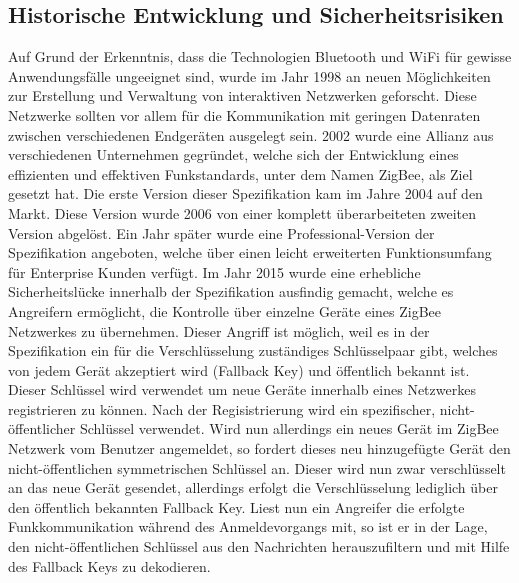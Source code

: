 \begin{multicols}{3}
\subsection*{Historische Entwicklung und Sicherheitsrisiken}
Auf Grund der Erkenntnis, dass die Technologien Bluetooth und WiFi für gewisse Anwendungsfälle ungeeignet sind, wurde im Jahr 1998 an neuen Möglichkeiten zur Erstellung und Verwaltung von interaktiven Netzwerken geforscht. Diese Netzwerke sollten vor allem für die Kommunikation mit geringen Datenraten zwischen verschiedenen Endgeräten ausgelegt sein. 2002 wurde eine Allianz aus verschiedenen Unternehmen gegründet, welche sich der Entwicklung eines effizienten und effektiven Funkstandards, unter dem Namen ZigBee, als Ziel gesetzt hat. Die erste Version dieser Spezifikation kam im Jahre 2004 auf den Markt. Diese Version wurde 2006 von einer komplett überarbeiteten zweiten Version abgelöst. Ein Jahr später wurde eine Professional-Version der Spezifikation angeboten, welche über einen leicht erweiterten Funktionsumfang für Enterprise Kunden verfügt. 
Im Jahr 2015 wurde eine erhebliche Sicherheitslücke innerhalb der Spezifikation ausfindig gemacht, welche es Angreifern ermöglicht, die Kontrolle über einzelne Geräte eines ZigBee Netzwerkes zu übernehmen. Dieser Angriff ist möglich, weil es in der Spezifikation ein für die Verschlüsselung zuständiges Schlüsselpaar gibt, welches von jedem Gerät akzeptiert wird (Fallback Key) und öffentlich bekannt ist. Dieser Schlüssel wird verwendet um neue Geräte innerhalb eines Netzwerkes registrieren zu können. Nach der Regisistrierung wird ein spezifischer, nicht-öffentlicher Schlüssel verwendet. Wird nun allerdings ein neues Gerät im ZigBee Netzwerk vom Benutzer angemeldet, so fordert dieses neu hinzugefügte Gerät den nicht-öffentlichen symmetrischen Schlüssel an. Dieser wird nun zwar verschlüsselt an das neue Gerät gesendet, allerdings erfolgt die Verschlüsselung lediglich über den öffentlich bekannten Fallback Key. Liest nun ein Angreifer die erfolgte Funkkommunikation während des Anmeldevorgangs mit, so ist er in der Lage, den nicht-öffentlichen Schlüssel aus den Nachrichten herauszufiltern und mit Hilfe des Fallback Keys zu dekodieren.~\cite{zigbee.12} 


\end{multicols}
